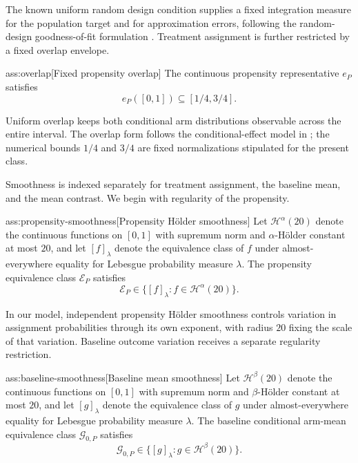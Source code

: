 \documentclass[11pt]{article}
\begin{document}
The known uniform random design condition supplies a fixed integration measure for the population target and for approximation errors, following the random-design goodness-of-fit formulation \citep{IngsterSapatinas2009GoodnessOfFit}. Treatment assignment is further restricted by a fixed overlap envelope.

\begin{assumptionv}{ass:overlap}[Fixed propensity overlap]
The continuous propensity representative \(e_P\) satisfies
\[
e_P([0,1])\subseteq[1/4,3/4].
\]
\end{assumptionv}

Uniform overlap keeps both conditional arm distributions observable across the entire interval. The overlap form follows the conditional-effect model in \citet[Section 2]{KennedyBalakrishnanRobinsWasserman2024MinimaxCATE}; the numerical bounds \(1/4\) and \(3/4\) are fixed normalizations stipulated for the present class.

Smoothness is indexed separately for treatment assignment, the baseline mean, and the mean contrast. We begin with regularity of the propensity.

\begin{assumptionv}{ass:propensity-smoothness}[Propensity Hölder smoothness]
Let \(\mathcal H^\alpha(20)\) denote the continuous functions on \([0,1]\) with supremum norm and \(\alpha\)-Hölder constant at most \(20\), and let \([f]_\lambda\) denote the equivalence class of \(f\) under almost-everywhere equality for Lebesgue probability measure \(\lambda\). The propensity equivalence class \(\mathcal E_P\) satisfies
\[
\mathcal E_P\in\{[f]_\lambda:f\in\mathcal H^\alpha(20)\}.
\]
\end{assumptionv}

In our model, independent propensity Hölder smoothness controls variation in assignment probabilities through its own exponent, with radius \(20\) fixing the scale of that variation. Baseline outcome variation receives a separate regularity restriction.

\begin{assumptionv}{ass:baseline-smoothness}[Baseline mean smoothness]
Let \(\mathcal H^\beta(20)\) denote the continuous functions on \([0,1]\) with supremum norm and \(\beta\)-Hölder constant at most \(20\), and let \([g]_\lambda\) denote the equivalence class of \(g\) under almost-everywhere equality for Lebesgue probability measure \(\lambda\). The baseline conditional arm-mean equivalence class \(\mathcal G_{0,P}\) satisfies
\[
\mathcal G_{0,P}\in\{[g]_\lambda:g\in\mathcal H^\beta(20)\}.
\]
\end{assumptionv}
\end{document}
